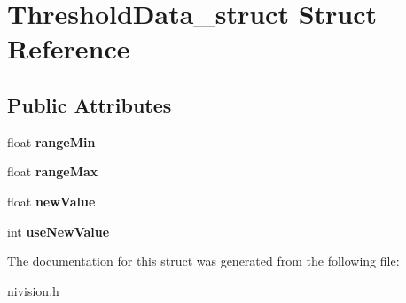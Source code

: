 \hypertarget{structThresholdData__struct}{
\section{ThresholdData\_\-struct Struct Reference}
\label{structThresholdData__struct}
}
\subsection*{Public Attributes}
\begin{DoxyCompactItemize}
\item 
\hypertarget{structThresholdData__struct_ad0117491c9644ddf7bd4ab1965bb354f}{
float {\bfseries rangeMin}}
\label{structThresholdData__struct_ad0117491c9644ddf7bd4ab1965bb354f}

\item 
\hypertarget{structThresholdData__struct_a26a34939defda66770519cf3f273aeb7}{
float {\bfseries rangeMax}}
\label{structThresholdData__struct_a26a34939defda66770519cf3f273aeb7}

\item 
\hypertarget{structThresholdData__struct_a718a46b0ba8daa43fdd8b4f7db007d85}{
float {\bfseries newValue}}
\label{structThresholdData__struct_a718a46b0ba8daa43fdd8b4f7db007d85}

\item 
\hypertarget{structThresholdData__struct_a414adf7b97ee121194b77912af6fd803}{
int {\bfseries useNewValue}}
\label{structThresholdData__struct_a414adf7b97ee121194b77912af6fd803}

\end{DoxyCompactItemize}


The documentation for this struct was generated from the following file:\begin{DoxyCompactItemize}
\item 
nivision.h\end{DoxyCompactItemize}

